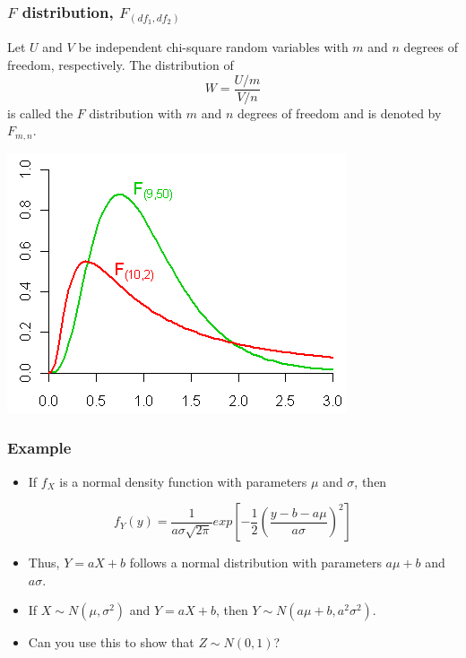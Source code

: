 \documentclass[
]{article}
\providecommand{\tightlist}{%
  \setlength{\itemsep}{0pt}\setlength{\parskip}{0pt}}
\begin{document}
\hypertarget{f-distribution-f_df_1df_2}{%
\subsubsection{\texorpdfstring{\(F\) distribution,
\(F_{(df_1,df_2)}\)}{F distribution, F\_\{(df\_1,df\_2)\}}}\label{f-distribution-f_df_1df_2}}

Let \(U\) and \(V\) be independent chi-square random variables with
\(m\) and \(n\) degrees of freedom, respectively. The distribution of
\[W=\frac{U/m}{V/n}\] is called the \(F\) distribution with \(m\) and
\(n\) degrees of freedom and is denoted by \(F_{m,n}\).

\begin{center}\includegraphics[width=0.5\linewidth,height=0.5\textheight]{fdist} \end{center}

\hypertarget{example}{%
\subsubsection{Example}\label{example}}

\begin{itemize}
\tightlist
\item
  If \(f_X\) is a normal density function with parameters \(\mu\) and
  \(\sigma\), then
\end{itemize}

\[f_Y (y) = \frac{1}{a\sigma\sqrt{2\pi }}exp\left[-\frac{1}{2}\left(\frac{y-b-a\mu}{a\sigma}\right)^2\right]\]

\begin{itemize}
\item
  Thus, \(Y = aX + b\) follows a normal distribution with parameters
  \(a \mu + b\) and \(a\sigma\).
\item
  If \(X \sim N(\mu, \sigma^2)\) and \(Y = aX + b\), then
  \(Y \sim N(a \mu + b, a^2\sigma^2)\).
\item
  Can you use this to show that \(Z\sim N(0,1)\)?
\end{itemize}
\end{document}
